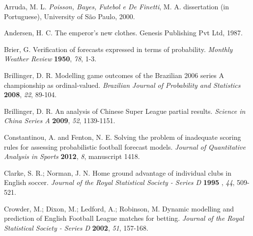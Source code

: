 \documentclass[journal,article,accept,moreauthors,pdftex,12pt,a4paper]{mdpi}
\begin{document}
    \begin{thebibliography}{999} %




        Arruda, M. L. {\em Poisson, Bayes, Futebol e De Finetti}, M. A. dissertation (in Portuguese), University of S\~ao Paulo, 2000.

        Andersen, H.  C. The emperor's new clothes. Genesis Publishing Pvt Ltd, 1987.

        Brier, G. Verification of forecasts expressed in terms of probability. {\em Monthly Weather Review} {\bf 1950}, {\em 78}, 1-3.

        Brillinger, D. R. Modelling game outcomes of the Brazilian 2006
        series A championship as ordinal-valued. {\em Brazilian Journal of Probability and Statistics} {\bf 2008}, {\em 22}, 89-104.

        Brillinger, D. R. An analysis of Chinese Super League partial
        results. {\em Science in China Series A} {\bf 2009}, {\em 52},
        1139-1151.

        Constantinou, A. and Fenton, N. E. Solving the problem of inadequate scoring rules for assessing probabilistic football forecast models. {\em Journal of Quantitative Analysis in Sports} {\bf 2012}, {\em 8}, manuscript 1418.

        Clarke, S. R.; Norman, J. N. Home ground advantage of individual clubs in English soccer. {\em Journal of the Royal Statistical Society - Series D} {\bf 1995} ,
        {\em 44}, 509-521.

         Crowder, M.; Dixon, M.; Ledford, A.; Robinson, M. Dynamic modelling and prediction of English
        Football League matches for betting. {\em Journal of the Royal
            Statistical Society - Series D} {\bf 2002}, {\em 51}, 157-168.


\end{thebibliography}
\end{document}
